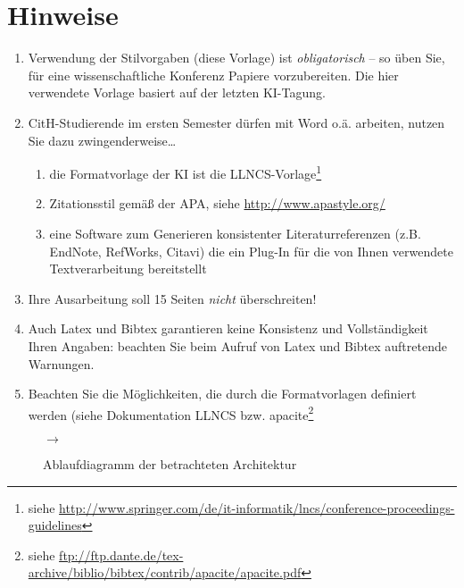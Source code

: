 \documentclass{llncs}
\begin{document}
\section{Hinweise}
\begin{enumerate}
	\item Verwendung der Stilvorgaben (diese Vorlage) ist \emph{obligatorisch} -- so üben Sie, für eine wissenschaftliche Konferenz Papiere vorzubereiten. Die hier verwendete Vorlage basiert auf der letzten KI-Tagung. 
	
	\item CitH-Studierende im ersten Semester dürfen mit Word o.ä. arbeiten, nutzen Sie dazu zwingenderweise\ldots
	\begin{enumerate}
		\item die Formatvorlage der KI ist die LLNCS-Vorlage\footnote{\scriptsize siehe \url{http://www.springer.com/de/it-informatik/lncs/conference-proceedings-guidelines}}
		\item Zitationsstil gemäß der APA, siehe \url{http://www.apastyle.org/}
		\item eine Software zum Generieren konsistenter Literaturreferenzen (z.B. EndNote, RefWorks, Citavi) die ein Plug-In für die von Ihnen verwendete Textverarbeitung bereitstellt
	\end{enumerate}
	
	\item Ihre Ausarbeitung soll 15 Seiten \emph{nicht} überschreiten!
	
	\item Auch Latex und Bibtex garantieren keine Konsistenz und Vollständigkeit Ihren Angaben: beachten Sie beim Aufruf von Latex und Bibtex auftretende Warnungen.
	
	\item Beachten Sie die Möglichkeiten, die durch die Formatvorlagen definiert werden (siehe Dokumentation LLNCS bzw. apacite\footnote{\scriptsize siehe \url{ftp://ftp.dante.de/tex-archive/biblio/bibtex/contrib/apacite/apacite.pdf}}
\end{enumerate}

\begin{figure}
\centering
{} $\to$ 
\caption{\label{fig:diagramm}Ablaufdiagramm der betrachteten Architektur}
\end{figure}



\end{document}
